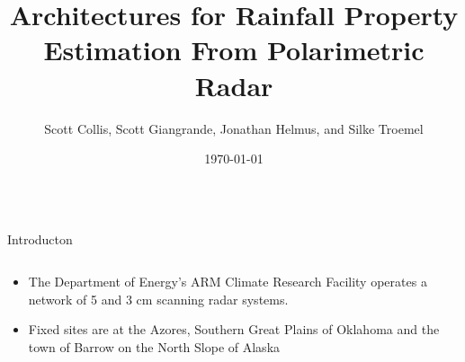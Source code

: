 \documentclass[final]{beamer}
\title{\huge Architectures for Rainfall Property Estimation From Polarimetric Radar}
\author[Collis et al.]{Scott Collis, Scott Giangrande, Jonathan Helmus, and Silke Troemel}
\institute[Argonne]{Argonne National Laboratory Argonne, ILUnited States }
\date{\today}
\begin{document}
\begin{frame}{} 
 \begin{columns}[t]
    \begin{column}{.3\linewidth}
  \vfill
 
      \begin{block}{Introducton}
        \begin{columns}[t]
          \begin{column}{.5\linewidth}
        \begin{itemize}
        \item The Department of Energy's ARM Climate Research Facility operates a network of 5 and 3 cm scanning radar systems.
        \item Fixed sites are at the Azores, Southern Great Plains of Oklahoma and the town of Barrow on the North Slope of Alaska                                %
         \end{itemize}
         \end{column}
         \end{columns}
         \end{block}
         

\end{column}
\end{columns}
\end{frame}
\end{document}
